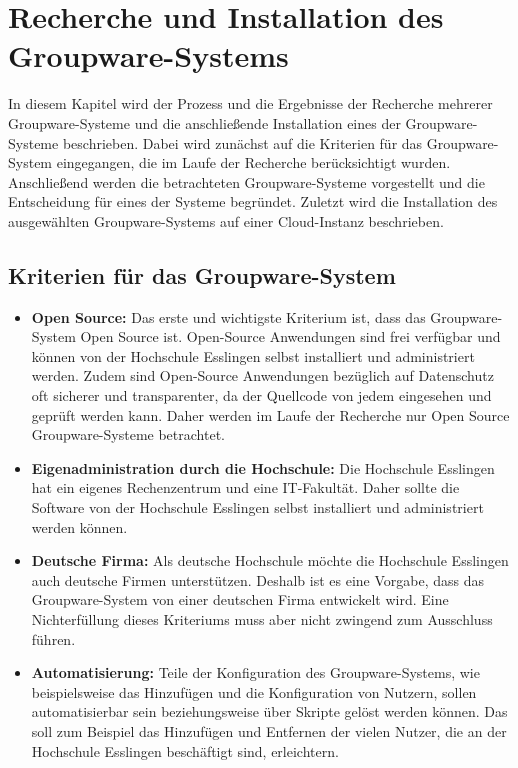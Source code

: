 
\chapter{Recherche und Installation des Groupware-Systems}

In diesem Kapitel wird der Prozess und die Ergebnisse der Recherche mehrerer Groupware-Systeme und die anschließende Installation eines der Groupware-Systeme beschrieben.
Dabei wird zunächst auf die Kriterien für das Groupware-System eingegangen, die im Laufe der Recherche berücksichtigt wurden.
Anschließend werden die betrachteten Groupware-Systeme vorgestellt und die Entscheidung für eines der Systeme begründet.
Zuletzt wird die Installation des ausgewählten Groupware-Systems auf einer Cloud-Instanz beschrieben.

\section{Kriterien für das Groupware-System}
\begin{itemize}
    \item \textbf{Open Source:} 
    Das erste und wichtigste Kriterium ist, dass das Groupware-System Open Source ist.
    Open-Source Anwendungen sind frei verfügbar und können von der Hochschule Esslingen selbst installiert und administriert werden.
    Zudem sind Open-Source Anwendungen bezüglich auf Datenschutz oft sicherer und transparenter, da der Quellcode von jedem eingesehen und geprüft werden kann.
    Daher werden im Laufe der Recherche nur Open Source Groupware-Systeme betrachtet.
    \item \textbf{Eigenadministration durch die Hochschule:}
    Die Hochschule Esslingen hat ein eigenes Rechenzentrum und eine IT-Fakultät.
    Daher sollte die Software von der Hochschule Esslingen selbst installiert und administriert werden können.
    \item \textbf{Deutsche Firma:}
    Als deutsche Hochschule möchte die Hochschule Esslingen auch deutsche Firmen unterstützen.
    Deshalb ist es eine Vorgabe, dass das Groupware-System von einer deutschen Firma entwickelt wird.
    Eine Nichterfüllung dieses Kriteriums muss aber nicht zwingend zum Ausschluss führen.
    \item \textbf{Automatisierung:}
    Teile der Konfiguration des Groupware-Systems, wie beispielsweise das Hinzufügen und die Konfiguration von Nutzern, sollen automatisierbar sein beziehungsweise über Skripte gelöst werden können.
    Das soll zum Beispiel das Hinzufügen und Entfernen der vielen Nutzer, die an der Hochschule Esslingen beschäftigt sind, erleichtern.
\end{itemize}

